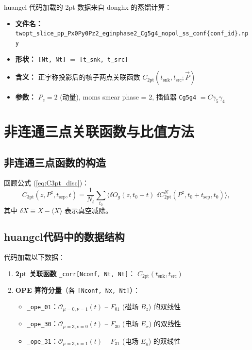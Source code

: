 \documentclass[12pt,a4paper]{ctexart}
\newcommand{\Pz}{P^{z}}
\newcommand{\tsep}{t_{\text{sep}}}
\begin{document}
huangcl 代码加载的 2pt 数据来自 donghx 的蒸馏计算：
\begin{itemize}
    \item \textbf{文件名：}
        \texttt{twopt\_slice\_pp\_Px0Py0Pz2\_eginphase2\_Cg5g4\_nopol\_ss\_conf\{conf\_id\}.npy}
    \item \textbf{形状：} \texttt{[Nt, Nt]} $=$ \texttt{[t\_snk, t\_src]}
    \item \textbf{含义：} 正宇称投影后的核子两点关联函数
        $C_{\text{2pt}}(t_{\text{snk}}, t_{\text{src}}; \vec{P})$
    \item \textbf{参数：} $P_z = 2$ (动量), moms smear phase = 2,
        插值器 \texttt{Cg5g4} $= C\gamma_5\gamma_4$
\end{itemize}


\section{非连通三点关联函数与比值方法}\label{sec:three_point}

\subsection{非连通三点函数的构造}

回顾公式 (\ref{eq:C3pt_disc})：
\begin{equation*}
C_{\text{3pt}}(z, \Pz, \tsep, t) =
    \frac{1}{N_t} \sum_{t_0}
    \big\langle \delta O_g(z, t_0+t) \;
    \delta C^{N}_{\text{2pt}}(\Pz, t_0+\tsep, t_0) \big\rangle,
\end{equation*}
其中 $\delta X \equiv X - \langle X \rangle$ 表示真空减除。

\subsection{huangcl代码中的数据结构}

代码加载以下数据：
\begin{enumerate}
    \item \textbf{2pt 关联函数} \texttt{\_corr[Nconf, Nt, Nt]}：
        $C_{\text{2pt}}(t_{\text{snk}}, t_{\text{src}})$

    \item \textbf{OPE 算符分量}（各 \texttt{[Nconf, Nx, Nt]}）：
        \begin{itemize}
            \item \texttt{\_ope\_01}：$\mathcal{O}_{\mu=0,\nu=1}(t)$
                -- $F_{01}$ (磁场 $B_z$) 的双线性
            \item \texttt{\_ope\_30}：$\mathcal{O}_{\mu=3,\nu=0}(t)$
                -- $F_{30}$ (电场 $E_x$) 的双线性
            \item \texttt{\_ope\_31}：$\mathcal{O}_{\mu=3,\nu=1}(t)$
                -- $F_{31}$ (电场 $E_y$) 的双线性
        \end{itemize}
\end{enumerate}
\end{document}
